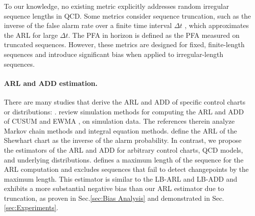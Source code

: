 \documentclass{article}
\theoremstyle{plain}
\theoremstyle{definition}
\theoremstyle{remark}
\begin{document}
To our knowledge, no existing metric explicitly addresses random irregular sequence lengths in QCD.
Some metrics consider sequence truncation, such as the inverse of the false alarm rate over a finite time interval $\Delta t$ \citep{alakent2018application}, which approximates the ARL for large $\Delta t$.
The PFA in horizon \citep{huang2024high} is defined as the PFA measured on truncated sequences.
However, these metrics are designed for fixed, finite-length sequences and introduce significant bias when applied to irregular-length sequences.


\paragraph{ARL and ADD estimation.}
There are many studies that derive the ARL and ADD of specific control charts or distributions:
\citep{reynolds1975approximations, crowder1987simple, saccucci1990average, knoth1998exact, fu2002average, areepong2022integral, haq2022note, sunthornwat2023analytical}.
\citet{li2014computation} review simulation methods for computing the ARL and ADD of CUSUM \citep{page1954continuous_CUSUM_org} and EWMA \citep{roberts2000control_EWMA_org}, on simulation data.
The references therein analyze Markov chain methods and integral equation methods.
\citet{alakent2018application} define the ARL of the Shewhart chart as the inverse of the alarm probability.
In contrast, we propose the estimators of the ARL and ADD for arbitrary control charts, QCD models, and underlying distributions.
\citet{qiu2013introduction} defines a maximum length of the sequence for the ARL computation and excludes sequences that fail to detect changepoints by the maximum length. This estimator is similar to the LB-ARL and LB-ADD and exhibits a more substantial
negative bias than our ARL estimator due to truncation, as proven in Sec.\ref{sec:Bias Analysis} and demonstrated in Sec.\ref{sec:Experiments}.
\end{document}
